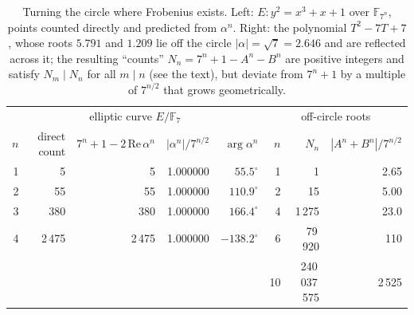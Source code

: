 \documentclass[11pt,a4paper]{article}
\theoremstyle{definition}\newtheorem{definition}[proposition]{Definition}
\theoremstyle{remark}\newtheorem{remark}[proposition]{Remark}
\begin{document}
\begin{table}[ht]\centering\small
\caption{Turning the circle where Frobenius exists. Left: $E\colon y^2=x^3+x+1$ over $\mathbb F_{7^n}$, points counted directly and predicted from $\alpha^n$. Right: the polynomial $T^2-7T+7$, whose roots $5.791$ and $1.209$ lie off the circle $|\alpha|=\sqrt7=2.646$ and are reflected across it; the resulting ``counts'' $N_n=7^n+1-A^n-B^n$ are positive integers and satisfy $N_m\mid N_n$ for all $m\mid n$ (see the text), but deviate from $7^n+1$ by a multiple of $7^{n/2}$ that grows geometrically.}\label{tab:turning}
\begin{tabular}{rrrrr@{\qquad}rrr}
\toprule
\multicolumn{5}{c}{elliptic curve $E/\mathbb F_7$} & \multicolumn{3}{c}{off-circle roots}\\
$n$ & direct count & $7^n+1-2\,\mathrm{Re}\,\alpha^n$ & $|\alpha^n|/7^{n/2}$ & $\arg\alpha^n$ & $n$ & $N_n$ & $|A^n+B^n|/7^{n/2}$\\
\midrule
1 & 5 & 5 & 1.000000 & $55.5^\circ$ & 1 & 1 & 2.65\\
2 & 55 & 55 & 1.000000 & $110.9^\circ$ & 2 & 15 & 5.00\\
3 & 380 & 380 & 1.000000 & $166.4^\circ$ & 4 & 1\,275 & 23.0\\
4 & 2\,475 & 2\,475 & 1.000000 & $-138.2^\circ$ & 6 & 79\,920 & 110\\
 & & & & & 10 & 240\,037\,575 & 2\,525\\
\bottomrule
\end{tabular}
\end{table}
\end{document}
